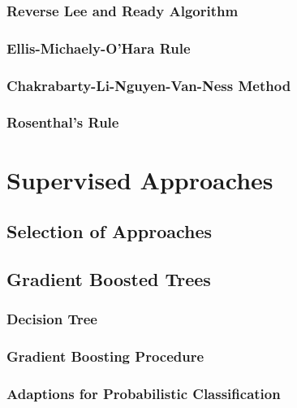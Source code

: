 \subsubsection{Reverse Lee and Ready
Algorithm}\label{reverse-lee-and-ready-algorithm}

\subsubsection{Ellis-Michaely-O'Hara
Rule}\label{ellis-michaely-ohara-rule}

\subsubsection{Chakrabarty-Li-Nguyen-Van-Ness
Method}\label{chakarabarty-li-nguyen-van-ness-method}

\subsubsection{Rosenthal's Rule}\label{rosenthals-rule}

\newpage
\section{Supervised Approaches}\label{supervised-approaches}

\subsection{Selection of Approaches}\label{selection-of-approaches}

\subsection{Gradient Boosted Trees}\label{gradient-boosted-trees}

\subsubsection{Decision Tree}\label{decision-tree}

\subsubsection{Gradient Boosting
Procedure}\label{gradient-boosting-procedure}

\subsubsection{Adaptions for Probabilistic
Classification}\label{adaptions-for-probablistic-classification}

